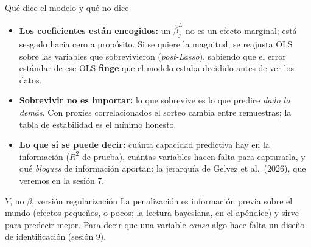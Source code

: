 \documentclass{beamer}
\newcommand{\1}{\mathbb{I}}
\begin{document}
\begin{frame}{Qué dice el modelo y qué no dice}
\small
\begin{itemize}\itemsep3pt
  \item \textbf{Los coeficientes están encogidos:} un $\hat{\beta}^L_j$ no es un efecto marginal; está sesgado hacia cero a propósito. Si se quiere la magnitud, se reajusta OLS sobre las variables que sobrevivieron (\emph{post-Lasso}), sabiendo que el error estándar de ese OLS \textbf{finge} que el modelo estaba decidido antes de ver los datos. \pause
  \item \textbf{Sobrevivir no es importar:} lo que sobrevive es lo que predice \emph{dado lo demás}. Con proxies correlacionados el sorteo cambia entre remuestras; la tabla de estabilidad es el mínimo honesto. \pause
  \item \textbf{Lo que sí se puede decir:} cuánta capacidad predictiva hay en la información ($R^2$ de prueba), cuántas variables hacen falta para capturarla, y qué \emph{bloques} de información aportan: la jerarquía de Gelvez et al.\ (2026), que veremos en la sesión 7. \pause
\end{itemize}
\begin{block}{$Y$, no $\beta$, versión regularización}
La penalización es información previa sobre el mundo (efectos pequeños, o pocos; la lectura bayesiana, en el apéndice) y sirve para predecir mejor. Para decir que una variable \emph{causa} algo hace falta un diseño de identificación (sesión 9).
\end{block}
\end{frame}
\end{document}
